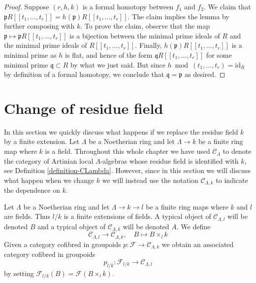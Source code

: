 \begin{proof}
Suppose $(r, h, k)$ is a formal homotopy between $f_1$ and $f_2$.
We claim that
$\mathfrak pR[[t_1, \ldots, t_r]] = h(\mathfrak p)R[[t_1, \ldots, t_r]]$.
The claim implies the lemma by further composing with $k$.
To prove the claim, observe that the map
$\mathfrak p \mapsto \mathfrak pR[[t_1, \ldots, t_r]]$
is a bijection between the minimal prime ideals of $R$ and the
minimal prime ideals of $R[[t_1, \ldots, t_r]]$.
Finally, $h(\mathfrak p)R[[t_1, \ldots, t_r]]$ is a minimal
prime as $h$ is flat, and hence of the form
$\mathfrak q R[[t_1, \ldots, t_r]]$ for some minimal
prime $\mathfrak q \subset R$ by what we just said.
But since $h \bmod (t_1, \ldots, t_r) = \text{id}_R$ by
definition of a formal homotopy, we conclude that
$\mathfrak q = \mathfrak p$ as desired.
\end{proof}











\section{Change of residue field}
\label{section-change-of-field}

\noindent
In this section we quickly discuss what happens if we replace the residue
field $k$ by a finite extension. Let $\Lambda$ be a Noetherian ring and
let $\Lambda \to k$ be a finite ring map where $k$ is a field. Throughout
this whole chapter we have used $\mathcal{C}_\Lambda$ to denote the
category of Artinian local $\Lambda$-algebras whose residue field is
identified with $k$, see Definition \ref{definition-CLambda}.
However, since in this section we will discuss what happen when we change
$k$ we will instead use the notation $\mathcal{C}_{\Lambda, k}$ to
indicate the dependence on $k$.

\begin{situation}
\label{situation-change-of-fields}
Let $\Lambda$ be a Noetherian ring and let $\Lambda \to k \to l$ be a finite
ring maps where $k$ and $l$ are fields. Thus $l/k$ is a finite
extensions of fields. A typical object of $\mathcal{C}_{\Lambda, l}$ will be
denoted $B$ and a typical object of $\mathcal{C}_{\Lambda, k}$ will be
denoted $A$. We define
\begin{equation}
\label{equation-comparison}
\mathcal{C}_{\Lambda, l} \longrightarrow \mathcal{C}_{\Lambda, k},
\quad
B \longmapsto B \times_l k
\end{equation}
Given a category cofibred in groupoids
$p : \mathcal{F} \to \mathcal{C}_{\Lambda, k}$ we obtain
an associated category cofibred in groupoids
$$
p_{l/k} : \mathcal{F}_{l/k} \longrightarrow \mathcal{C}_{\Lambda, l}
$$
by setting $\mathcal{F}_{l/k}(B) = \mathcal{F}(B \times_l k)$.
\end{situation}


